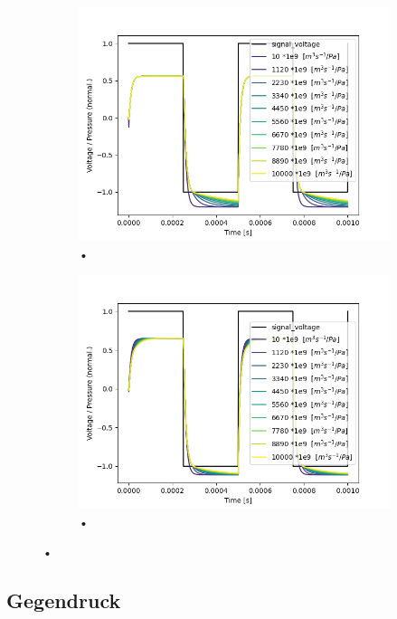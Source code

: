 \documentclass[fontsize=12pt, a4paper]{scrartcl}
\begin{document}
\begin{figure}[H]
	\centering
	\begin{subfigure}[H]{0.48\textwidth}
		\includegraphics[width=\textwidth, valign=t]{bilder/velveresistance/vr_out_branch_multisweep.png}
		\caption{•}
	\end{subfigure}
	\begin{subfigure}[H]{0.48\textwidth}
		\includegraphics[width=\textwidth, valign=t]{bilder/velveresistance/vr_both_branch_multisweep.png}
		\caption{•}
	\end{subfigure}
	\caption{•}
\end{figure}

\subsection{Gegendruck}
\end{document}
